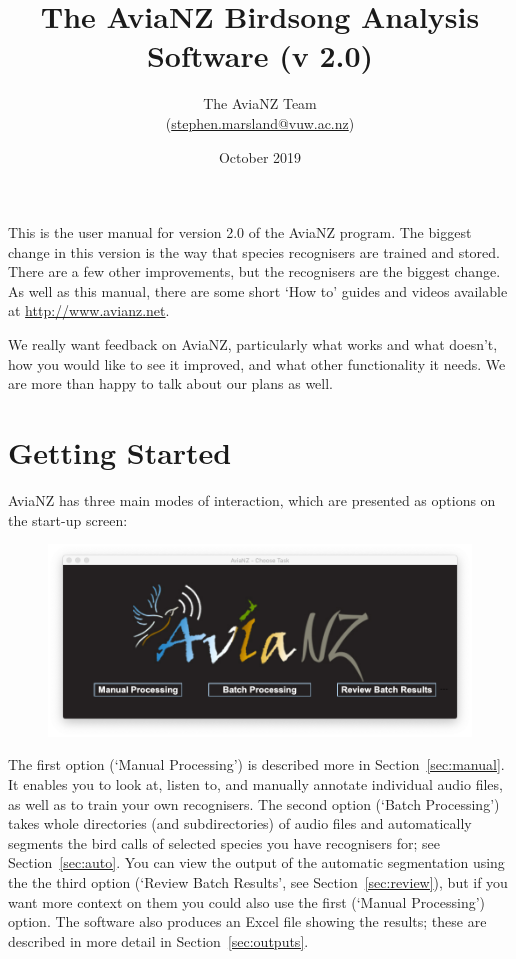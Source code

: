 \documentclass{article}
\title{The AviaNZ Birdsong Analysis Software (v 2.0)}
\author{The AviaNZ Team \\(\url{stephen.marsland@vuw.ac.nz})}
\date{October 2019}
\begin{document}
\maketitle

This is the user manual for version 2.0 of the AviaNZ program. The biggest change in this version is the way that species recognisers are trained and stored. There are a few other improvements, but the recognisers are the biggest change.
As well as this manual, there are  some short `How to' guides  and videos available at \url{http://www.avianz.net}.
 
We really want feedback on AviaNZ, particularly what works and what doesn't, how you would like to see it improved, and what other functionality it needs. We are more than happy to talk about our plans as well. 

\tableofcontents


\section{Getting Started}


AviaNZ has three main modes of interaction, which are presented as options on the start-up screen:

\begin{figure}[h!]
\centering
\includegraphics[width=.3\textwidth]{Figs/splashscreen}
\label{welcome}
\end{figure}

The first option (`Manual Processing') is described more in Section~\ref{sec:manual}. It enables you to look at, listen to, and manually annotate individual audio files, as well as to train your own recognisers. The second option (`Batch Processing') takes whole directories (and subdirectories) of audio files and automatically segments the bird calls of selected species you have recognisers for; see Section~\ref{sec:auto}. You can view the output of the automatic segmentation using the the third option (`Review Batch Results', see Section~\ref{sec:review}), but if you want more context on them you could also use the first (`Manual Processing') option. 
The software also produces an Excel file showing the results; these are described in more detail in Section~\ref{sec:outputs}. 
\end{document}
